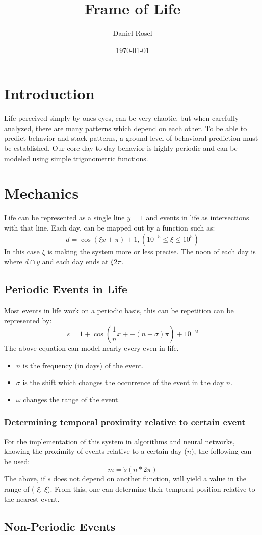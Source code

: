 \documentclass[11pt]{article}
\author{Daniel Rosel}
\date{\today}
\title{Frame of Life}
\begin{document}
\maketitle
\tableofcontents


\section{Introduction}
\label{sec:org8aed63f}
Life perceived simply by ones eyes, can be very chaotic, but when carefully analyzed, there are many patterns which depend on each other. To be able to predict behavior and stack patterns, a ground level of behavioral prediction must be established. Our core day-to-day behavior is highly periodic and can be modeled using simple trigonometric functions.
\section{Mechanics}
\label{sec:orgc35eee6}
Life can be represented as a single line \(y = 1\) and events in life as intersections with that line. Each day, can be mapped out by a function such as:
\begin{equation}
    d = \cos{(\xi x + \pi) + 1}, (10^{-5} \leq \xi \leq 10^{5})
\end{equation}
In this case \(\xi\) is making the system more or less precise. The noon of each day is where \(d \cap y\) and each day ends at \(\xi2\pi\).
\subsection{Periodic Events in Life}
\label{sec:org5484a32}
Most events in life work on a periodic basis, this can be repetition can be represented by:
\begin{equation}
s = 1 + \cos{(\frac{1}{n}x + -(n - \sigma)\pi) + 10^{-\omega}}
\end{equation}
The above equation can model nearly every even in life.
\begin{itemize}
\item \(n\) is the frequency (in days) of the event.
\item \(\sigma\) is the shift which changes the occurrence of the event in the day \(n\).
\item \(\omega\) changes the range of the event.
\end{itemize}
\subsubsection{Determining temporal proximity relative to certain event}
\label{sec:org022f9c1}
For the implementation of this system in algorithms and neural networks, knowing the proximity of events relative to a certain day (\(n\)), the following can be used:
\begin{equation}
    m = \dot{s}(n * 2\pi)
\end{equation}
The above, if \(s\) does not depend on another function, will yield a value in the range of (-\(\xi\), \(\xi\)). From this, one can determine their temporal position relative to the nearest event.

\subsection{Non-Periodic Events}
\label{sec:org22012e3}
\end{document}
